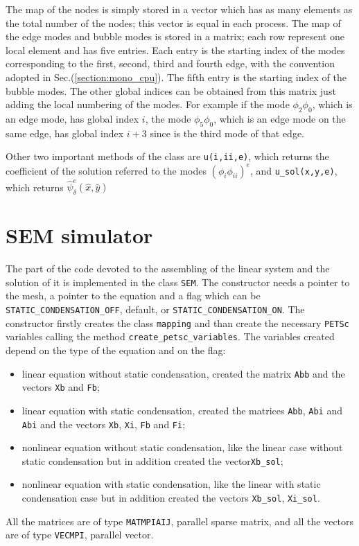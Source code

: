 The map of the nodes is simply stored in a vector which has as many elements as the total number of the nodes; this vector is equal in each process. The map of the edge modes and bubble modes is stored in a matrix; each row represent one local element and has five entries. Each entry is the starting index of the modes corresponding to the first, second, third and fourth edge, with the convention adopted in Sec.(\ref{section:mono_cpu}). The fifth entry is the starting index of the bubble modes. The other global indices can be obtained from this matrix just adding the local numbering of the modes. For example if the mode $\phi_2\phi_0$, which is an edge mode, has global index $i$, the mode $\phi_5\phi_0$, which is an edge mode on the same edge, has global index $i+3$ since is the third mode of that edge.
\medskip

Other two important methods of the class are \verb|u(i,ii,e)|, which returns the coefficient of the solution referred to the modes $(\phi_i\phi_{ii})^e$, and \verb|u_sol(x,y,e)|, which returns $\hat{\psi}^e_{\delta}(\hat{x},\hat{y})$

\section{SEM simulator}
The part of the code devoted to the assembling of the linear system and the solution of it is implemented in the class \verb|SEM|. The constructor needs a pointer to the mesh, a pointer to the equation and a flag which can be \verb|STATIC_CONDENSATION_OFF|, default,  or \verb|STATIC_CONDENSATION_ON|. The constructor firstly creates the class \verb|mapping| and than create the necessary \verb|PETSc| variables calling the method \verb|create_petsc_variables|. The variables created depend on the type of the equation and on the flag:
\begin{itemize}
  \item linear equation without static condensation, created the matrix \verb|Abb| and the vectors \verb|Xb| and \verb|Fb|;
  \item linear equation with static condensation, created the matrices \verb|Abb|, \verb|Abi| and \verb|Abi| and the vectors \verb|Xb|, \verb|Xi|, \verb|Fb| and \verb|Fi|;
  \item nonlinear equation without static condensation, like the linear case without static condensation but in addition created the vector\verb|Xb_sol|;
  \item nonlinear equation with static condensation, like the linear with static condensation case but in addition created the vectors \verb|Xb_sol|, \verb|Xi_sol|.
\end{itemize}
All the matrices are of type \verb|MATMPIAIJ|, parallel sparse matrix, and all the vectors are of type \verb|VECMPI|, parallel vector.
\medskip


